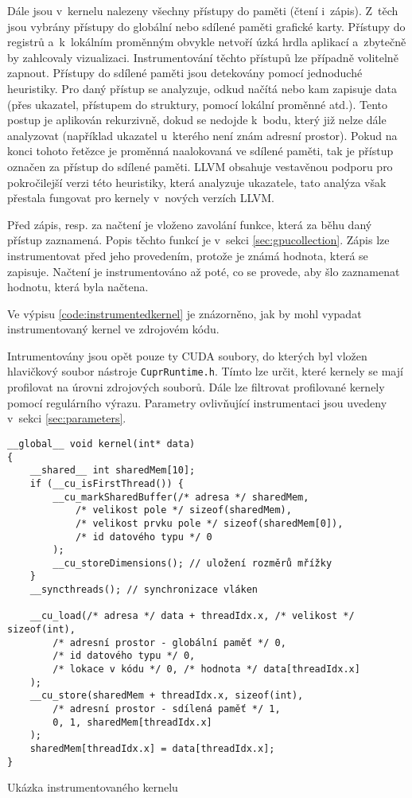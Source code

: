 Dále jsou v~kernelu nalezeny všechny přístupy do paměti (čtení i~zápis). Z~těch jsou vybrány přístupy do globální nebo sdílené paměti grafické karty. Přístupy do registrů a~k~lokálním proměnným obvykle netvoří úzká hrdla aplikací a~zbytečně by zahlcovaly vizualizaci. Instrumentování těchto přístupů lze případně volitelně zapnout. Přístupy do sdílené paměti jsou detekovány pomocí jednoduché heuristiky. Pro daný přístup se analyzuje, odkud načítá nebo kam zapisuje data (přes ukazatel, přístupem do struktury, pomocí lokální proměnné atd.). Tento postup je aplikován rekurzivně, dokud se nedojde k~bodu, který již nelze dále analyzovat (například ukazatel u~kterého není znám adresní prostor). Pokud na konci tohoto řetězce je proměnná naalokovaná ve sdílené paměti, tak je přístup označen za přístup do sdílené paměti. LLVM obsahuje vestavěnou podporu pro pokročilejší verzi této heuristiky, která analyzuje ukazatele, tato analýza však přestala fungovat pro kernely v~nových verzích LLVM.

Před zápis, resp. za načtení je vloženo zavolání funkce, která za běhu daný přístup zaznamená. Popis těchto funkcí je v~sekci \ref{sec:gpucollection}. Zápis lze instrumentovat před jeho provedením, protože je známá hodnota, která se zapisuje. Načtení je instrumentováno až poté, co se provede, aby šlo zaznamenat hodnotu, která byla načtena.

Ve výpisu \ref{code:instrumentedkernel} je znázorněno, jak by mohl vypadat instrumentovaný kernel ve zdrojovém kódu.
    
Intrumentovány jsou opět pouze ty CUDA soubory, do kterých byl vložen hlavičkový soubor nástroje \texttt{CuprRuntime.h}. Tímto lze určit, které kernely se mají profilovat na úrovni zdrojových souborů. Dále lze filtrovat profilované kernely pomocí regulárního výrazu. Parametry ovlivňující instrumentaci jsou uvedeny v~sekci \ref{sec:parameters}.

\begin{listing}
\begin{verbatim}
__global__ void kernel(int* data)
{
    __shared__ int sharedMem[10];
    if (__cu_isFirstThread()) {
        __cu_markSharedBuffer(/* adresa */ sharedMem,
            /* velikost pole */ sizeof(sharedMem),
            /* velikost prvku pole */ sizeof(sharedMem[0]),
            /* id datového typu */ 0
        );
        __cu_storeDimensions(); // uložení rozměrů mřížky
    }
    __syncthreads(); // synchronizace vláken
    
    __cu_load(/* adresa */ data + threadIdx.x, /* velikost */ sizeof(int),
        /* adresní prostor - globální paměť */ 0,
        /* id datového typu */ 0,
        /* lokace v kódu */ 0, /* hodnota */ data[threadIdx.x]
    );
    __cu_store(sharedMem + threadIdx.x, sizeof(int),
        /* adresní prostor - sdílená paměť */ 1,
        0, 1, sharedMem[threadIdx.x]
    );
    sharedMem[threadIdx.x] = data[threadIdx.x];
}
\end{verbatim}
\caption{Ukázka instrumentovaného kernelu}
\label{code:instrumentedkernel}
\end{listing}

